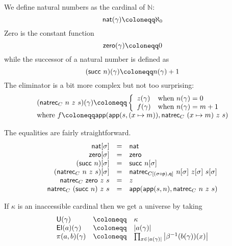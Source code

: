 
We define natural numbers as the cardinal of \(\mathbb{N}\):
\[
  \nat(\gamma) \coloneqq \aleph_0
\]
Zero is the constant function
\[
  \czero(\gamma) \coloneqq 0
\]
while the successor of a natural number is defined as
\[
  (\csucc\ n)(\gamma) \coloneqq n(\gamma) + 1
\]
The eliminator is a bit more complex but not too surprising:
\[
  \begin{array}{l}
    (\natrec_C\ n\ z\ s)(\gamma) \coloneqq
    \left\{
    \begin{array}{ll}
      z(\gamma) & \text{when \(n(\gamma) = 0\)} \\
      f(\gamma) &
      \text{when \(n(\gamma) = m + 1\)}
    \end{array}
    \right. \\
    \text{where } f \coloneqq
    \capp(\capp(s, (x \mapsto m)), \natrec_C\ (x \mapsto m)\ z\ s)
  \end{array}
\]

The equalities are fairly straightforward.
\[
  \begin{array}{rcl}
    \nat[\sigma] &=& \nat \\
    \czero[\sigma] &=& \czero \\
    (\csucc\ n)[\sigma] &=& \csucc\ n[\sigma] \\
    (\natrec_C\ n\ z\ s)[\sigma] &=&
    \natrec_{C[(\sigma \circ \pp), \pq]}\ n[\sigma]\ z[\sigma]\ s[\sigma] \\
    \natrec_C\ \czero\ z\ s &=& z \\
    \natrec_C\ (\csucc\ n)\ z\ s &=& \capp(\capp(s,n), \natrec_C\ n\ z\ s)
  \end{array}
\]


If \(\kappa\) is an inaccessible cardinal then we get a universe by taking
\[
  \begin{array}{lcl}
    \CU(\gamma) &\coloneqq& \kappa \\
    \CEl(a)(\gamma) &\coloneqq& \card{a(\gamma)} \\
    \pi(a,b)(\gamma) &\coloneqq&
    \prod_{x \in \card{a(\gamma)}} \card{\beta^{-1}(b(\gamma))(x)}
  \end{array}
\]

